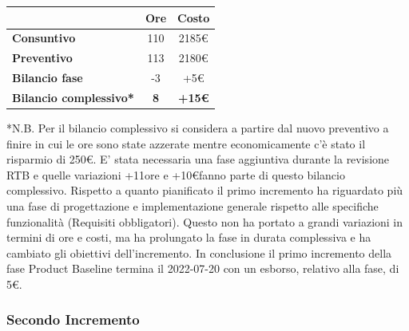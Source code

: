 \begin{center}
	\renewcommand{\arraystretch}{1.8}
	\begin{tabular}{ | l |c|c| }
    \hline
    & \textbf{Ore} & \textbf{Costo} \\
	\hline
    \textbf{Consuntivo} & 110 & 2185\euro \\
    \hline
    \textbf{Preventivo} & 113 & 2180\euro \\
    \hline
    \textbf{Bilancio fase} & -3 & +5\euro \\
    \hline
    \textbf{Bilancio complessivo*} & \textbf{8} & \textbf{+15\euro} \\
    \hline
    \end{tabular}
\end{center}
*N.B. Per il bilancio complessivo si considera a partire dal nuovo preventivo a finire in cui le ore sono state azzerate mentre economicamente c'è stato il risparmio di 250\euro.
E' stata necessaria una fase aggiuntiva durante la revisione RTB e quelle variazioni +11ore e +10\euro fanno parte di questo bilancio complessivo. \newline
Rispetto a quanto pianificato il primo incremento ha riguardato più una fase di progettazione e implementazione generale rispetto alle specifiche funzionalità (Requisiti obbligatori). Questo non ha portato a grandi variazioni in termini di ore e costi, ma ha prolungato la fase in durata complessiva e ha cambiato gli obiettivi dell'incremento.
In conclusione il primo incremento della fase Product Baseline termina il 2022-07-20 con un esborso, relativo
alla fase, di 5€.

\newpage

\subsubsection{Secondo Incremento}


